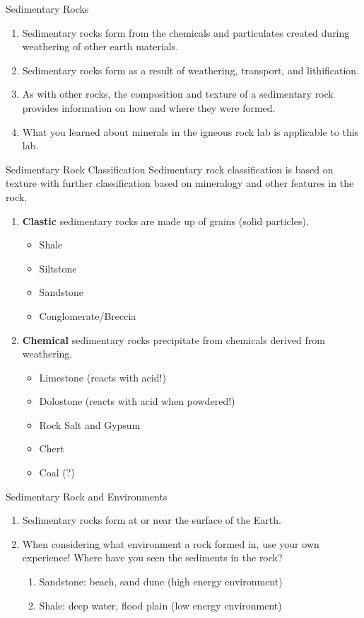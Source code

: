 \documentclass[ignorenonframetext,slidestop]{beamer}
\begin{document}
\begin{frame}{Sedimentary Rocks}
  \begin{enumerate}
  \item Sedimentary rocks form from the chemicals and particulates created during weathering of other earth materials.
  \item Sedimentary rocks form as a result of weathering, transport, and lithification.
  \item As with other rocks, the composition and texture of a sedimentary rock provides information on how and where they were formed.
  \item What you learned about minerals in the igneous rock lab is applicable to this lab.
  \end{enumerate}
\end{frame}

\begin{frame}{Sedimentary Rock Classification}
  Sedimentary rock classification is based on texture with further classification based on mineralogy and other features in the rock.
  \begin{enumerate}
  \item \textbf{Clastic} sedimentary rocks are made up of grains (solid particles).
    \begin{itemize}
    \item Shale
    \item Siltstone
    \item Sandstone
    \item Conglomerate/Breccia
    \end{itemize}
  \item \textbf{Chemical} sedimentary rocks precipitate from chemicals derived from weathering.
    \begin{itemize}
    \item Limestone (reacts with acid!)
    \item Dolostone (reacts with acid when powdered!)
    \item Rock Salt and Gypsum
    \item Chert
    \item Coal (?)
    \end{itemize}
  \end{enumerate}
\end{frame}

\begin{frame}{Sedimentary Rock and Environments}
  \begin{enumerate}
  \item  Sedimentary rocks form at or near the surface of the Earth.
  \item When considering what environment a rock formed in, use your own experience! Where have you seen the sediments in the rock?
    \begin{enumerate}
    \item Sandstone: beach, sand dune (high energy environment)
    \item Shale: deep water, flood plain (low energy environment)
    \end{enumerate}
  \end{enumerate}
\end{frame}
\end{document}
